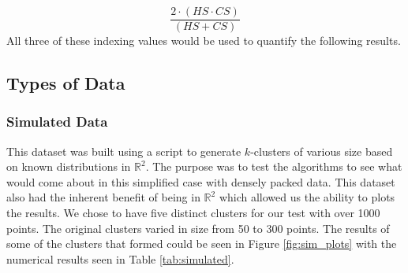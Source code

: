 \documentclass[a4paper,12pt]{article}
\numberwithin{equation}{section}
\begin{document}
\begin{equation}
\frac{2\cdot(HS \cdot CS) }{(HS + CS)}
\label{eq:v-measure}
\end{equation}
All three of these indexing values would be used to quantify the following results. 
\subsection{Types of Data}
\subsubsection{Simulated Data}
This dataset was built using a script to generate $k$-clusters of various size based on known distributions in $\mathbb{R}^2$.  The purpose was to test the algorithms to see what would come about in this simplified case with densely packed data.  This dataset also had the inherent benefit of being in $\mathbb{R}^2$ which allowed us the ability to plots the results.  We chose to have five distinct clusters for our test with over 1000 points.  The original clusters varied in size from 50 to 300 points. The results of  some of the clusters that formed could be seen in Figure \ref{fig:sim_plots} with the numerical results seen in Table \ref{tab:simulated}.
\end{document}
